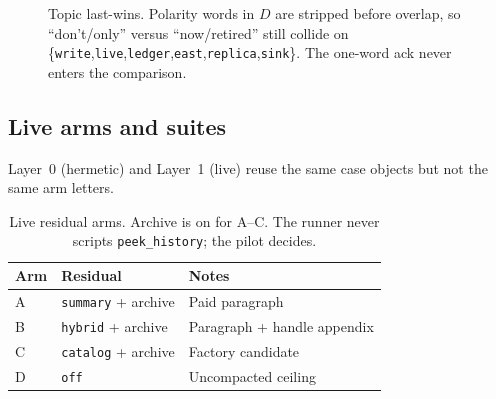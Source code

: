 \documentclass[11pt]{article}
\newcommand{\arm}[1]{\textsf{#1}}
\newcommand{\mode}[1]{\texttt{#1}}
\begin{document}
\begin{figure}[H]
\centering
{}
\caption{Topic last-wins. Polarity words in $D$ are stripped before
overlap, so ``don't/only'' versus ``now/retired'' still collide on
\{\texttt{write},\texttt{live},\texttt{ledger},\texttt{east},\texttt{replica},\texttt{sink}\}.
The one-word ack never enters the comparison.}
\label{fig:lastwins}
\end{figure}

\subsection{Live arms and suites}
\label{sec:arms}

Layer~0 (hermetic) and Layer~1 (live) reuse the same case objects but
not the same arm letters.

\begin{table}[ht]
\centering
\caption{Live residual arms. Archive is on for \arm{A}--\arm{C}. The
runner never scripts \texttt{peek\_history}; the pilot decides.}
\label{tab:arms}
\begin{tabular}{@{}lll@{}}
\toprule
Arm & Residual & Notes \\
\midrule
\arm{A} & \mode{summary} + archive & Paid paragraph \\
\arm{B} & \mode{hybrid} + archive & Paragraph + handle appendix \\
\arm{C} & \mode{catalog} + archive & Factory candidate \\
\arm{D} & \mode{off} & Uncompacted ceiling \\
\bottomrule
\end{tabular}
\end{table}
\end{document}
